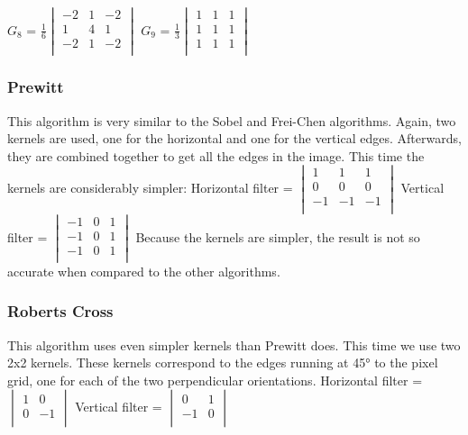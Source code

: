 \documentclass[12pt]{article}
\begin{document}
$G_8$ = $\frac{1}{6}$$\begin{vmatrix}
	-2 & 1 & -2\\
	1 & 4 & 1\\
	-2 & 1 & -2\\
\end{vmatrix}$\hspace{11mm}
$G_9$ = $\frac{1}{3}$$\begin{vmatrix}
	1 & 1 & 1\\
	1 & 1 & 1\\
	1 & 1 & 1\\
\end{vmatrix}$\hspace{5mm}

\subsubsection{Prewitt}
This algorithm is very similar to the Sobel and Frei-Chen algorithms. Again, two kernels are used, one for the horizontal and one for the vertical edges. Afterwards, they are combined together to get all the edges in the image.
\newline
\newline
This time the kernels are considerably simpler:
\newline
\newline
Horizontal filter = $\begin{vmatrix}
	1 & 1 & 1\\
	0 & 0 & 0\\
	-1 & -1 & -1\\
\end{vmatrix}$\hspace{11mm}
Vertical filter = $\begin{vmatrix}
	-1 & 0 & 1\\
	-1 & 0 & 1\\
	-1 & 0 & 1\\
\end{vmatrix}$
\newline
\newline
Because the kernels are simpler, the result is not so accurate when compared to the other algorithms.

\subsubsection{Roberts Cross}
This algorithm uses even simpler kernels than Prewitt does. This time we use two 2x2 kernels. These kernels correspond to the edges running at 45° to the pixel grid, one for each of the two perpendicular orientations.
\newline
\newline
Horizontal filter = $\begin{vmatrix}
	1 & 0 \\
	0 & -1 \\
\end{vmatrix}$\hspace{11mm}
Vertical filter = $\begin{vmatrix}
	0 & 1\\
	-1 & 0\\
\end{vmatrix}$
\end{document}
